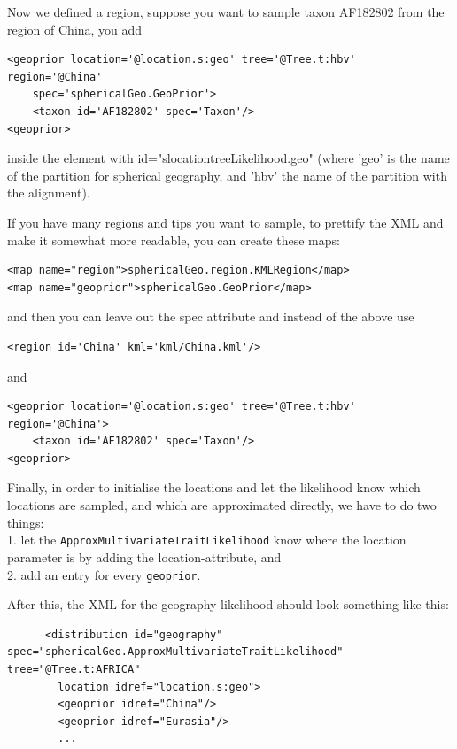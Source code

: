 \documentclass{article}
\begin{document}
Now we defined a region, suppose you want to sample taxon AF182802 from the region of China, you add

\begin{verbatim}
<geoprior location='@location.s:geo' tree='@Tree.t:hbv' region='@China'
	spec='sphericalGeo.GeoPrior'>
	<taxon id='AF182802' spec='Taxon'/> 
<geoprior>
\end{verbatim}

inside the element with id="slocationtreeLikelihood.geo" (where 'geo' is the name of the partition for spherical geography, and 'hbv' the name of the partition with the alignment).


If you have many regions and tips you want to sample, to prettify the XML and make it somewhat more readable, you can create these maps:

\begin{verbatim}
<map name="region">sphericalGeo.region.KMLRegion</map>
<map name="geoprior">sphericalGeo.GeoPrior</map>
\end{verbatim}

and then you can leave out the spec attribute and instead of the above use

\begin{verbatim}
<region id='China' kml='kml/China.kml'/>
\end{verbatim}

and 

\begin{verbatim}
<geoprior location='@location.s:geo' tree='@Tree.t:hbv' region='@China'>
	<taxon id='AF182802' spec='Taxon'/>
<geoprior>
\end{verbatim}



Finally, in order to initialise the locations and let the likelihood know which locations are sampled, and which are approximated directly, we have to do two things:\\
1. let the {\tt ApproxMultivariateTraitLikelihood} know where the location parameter is by adding the location-attribute, and\\
2. add an entry for every {\tt geoprior}.

After this, the XML for the geography likelihood should look something like this:

\begin{verbatim}
      <distribution id="geography" spec="sphericalGeo.ApproxMultivariateTraitLikelihood" tree="@Tree.t:AFRICA" 
		location idref="location.s:geo">
        <geoprior idref="China"/>
        <geoprior idref="Eurasia"/>
        ...
\end{verbatim}
\end{document}
